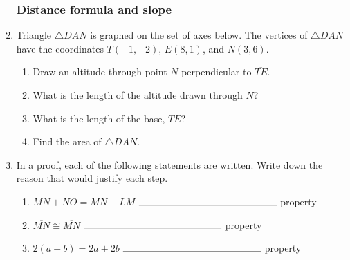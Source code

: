 \documentclass[12pt, twoside]{article}
\begin{document}
\begin{enumerate}
\subsubsection*{Distance formula and slope}

\item Triangle $\triangle DAN$ is graphed on the set of axes below. The vertices of $\triangle DAN$ have the coordinates $T(-1,-2)$, $E(8,1)$, and $N(3,6)$.
  \begin{center} %
  \end{center}
  \begin{enumerate}
    \item Draw an altitude through point $N$ perpendicular to $\overline{TE}$.
    \item What is the length of the altitude drawn through $N$?
    \item What is the length of the base, $TE$?
    \item Find the area of  $\triangle DAN$.
  \end{enumerate}

\newpage
  \item In a proof, each of the following statements are written. Write down the reason that would justify each step. \bigskip
    \begin{enumerate}
      \item $MN+NO= MN+LM$  \hspace{1.7cm} $\rule{5cm}{0.15mm}$ property  \bigskip
      \item $\overline{MN} \cong \overline{MN}$ \hspace{4cm} $\rule{5cm}{0.15mm}$ property \bigskip
      \item $2(a + b)=2a+2b$  \hspace{0.6cm} $\rule{5cm}{0.15mm}$ property
    \end{enumerate}


\end{enumerate}
\end{document}
